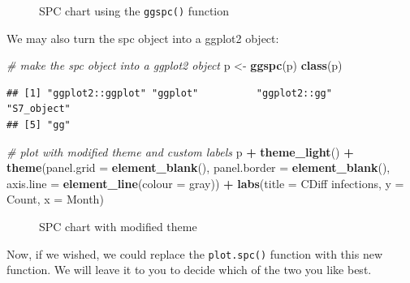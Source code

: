 \documentclass[
]{book}
\makeatletter
\newenvironment{Shaded}{\begin{snugshade}}{\end{snugshade}}
\newcommand{\AttributeTok}[1]{\textcolor[rgb]{0.13,0.29,0.53}{#1}}
\newcommand{\CommentTok}[1]{\textcolor[rgb]{0.56,0.35,0.01}{\textit{#1}}}
\newcommand{\FunctionTok}[1]{\textcolor[rgb]{0.13,0.29,0.53}{\textbf{#1}}}
\newcommand{\NormalTok}[1]{#1}
\newcommand{\OtherTok}[1]{\textcolor[rgb]{0.56,0.35,0.01}{#1}}
\newcommand{\SpecialCharTok}[1]{\textcolor[rgb]{0.81,0.36,0.00}{\textbf{#1}}}
\newcommand{\StringTok}[1]{\textcolor[rgb]{0.31,0.60,0.02}{#1}}
\newcommand*\pandocbounded[1]{%
  \sbox\pandoc@box{#1}%
  \Gscale@div\@tempa{\textheight}{\dimexpr\ht\pandoc@box+\dp\pandoc@box\relax}%
  \Gscale@div\@tempb{\linewidth}{\wd\pandoc@box}%
  \ifdim\@tempb\p@<\@tempa\p@\let\@tempa\@tempb\fi%
  \ifdim\@tempa\p@<\p@\scalebox{\@tempa}{\usebox\pandoc@box}%
  \else\usebox{\pandoc@box}%
  \fi%
}
\makeatother
\begin{document}
\begin{figure}
\centering
\pandocbounded{}
\caption{\label{fig:ggplot-fig2}SPC chart using the \texttt{ggspc()} function}
\end{figure}

We may also turn the spc object into a ggplot2 object:

\begin{Shaded}
\begin{Highlighting}[]
\CommentTok{\# make the spc object into a ggplot2 object}
\NormalTok{p }\OtherTok{\textless{}{-}} \FunctionTok{ggspc}\NormalTok{(p)}
\FunctionTok{class}\NormalTok{(p)}
\end{Highlighting}
\end{Shaded}

\begin{verbatim}
## [1] "ggplot2::ggplot" "ggplot"          "ggplot2::gg"     "S7_object"      
## [5] "gg"
\end{verbatim}

\begin{Shaded}
\begin{Highlighting}[]
\CommentTok{\# plot with modified theme and custom labels}
\NormalTok{p }\SpecialCharTok{+}
  \FunctionTok{theme\_light}\NormalTok{() }\SpecialCharTok{+}
  \FunctionTok{theme}\NormalTok{(}\AttributeTok{panel.grid   =} \FunctionTok{element\_blank}\NormalTok{(),}
        \AttributeTok{panel.border =} \FunctionTok{element\_blank}\NormalTok{(),}
        \AttributeTok{axis.line    =} \FunctionTok{element\_line}\NormalTok{(}\AttributeTok{colour =} \StringTok{\textquotesingle{}gray\textquotesingle{}}\NormalTok{)) }\SpecialCharTok{+}
  \FunctionTok{labs}\NormalTok{(}\AttributeTok{title =} \StringTok{\textquotesingle{}CDiff infections\textquotesingle{}}\NormalTok{,}
       \AttributeTok{y     =} \StringTok{\textquotesingle{}Count\textquotesingle{}}\NormalTok{,}
       \AttributeTok{x     =} \StringTok{\textquotesingle{}Month\textquotesingle{}}\NormalTok{)}
\end{Highlighting}
\end{Shaded}

\begin{figure}
\centering
\pandocbounded{}
\caption{\label{fig:ggplot-fig3}SPC chart with modified theme}
\end{figure}

Now, if we wished, we could replace the \texttt{plot.spc()} function with this new function. We will leave it to you to decide which of the two you like best.
\end{document}

